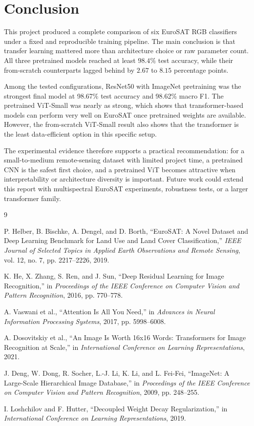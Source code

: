 \documentclass[11pt]{report}
\newcommand{\BestModel}{ResNet50 with ImageNet pretraining}
\newcommand{\BestAcc}{98.67}
\newcommand{\BestMacroFOne}{98.62}
\begin{document}
\chapter{Conclusion}
This project produced a complete comparison of six EuroSAT RGB classifiers under a fixed and reproducible training pipeline. The main conclusion is that transfer learning mattered more than architecture choice or raw parameter count. All three pretrained models reached at least \(98.4\%\) test accuracy, while their from-scratch counterparts lagged behind by \(2.67\) to \(8.15\) percentage points.

Among the tested configurations, \BestModel{} was the strongest final model at \BestAcc{}\% test accuracy and \BestMacroFOne{}\% macro F1. The pretrained ViT-Small was nearly as strong, which shows that transformer-based models can perform very well on EuroSAT once pretrained weights are available. However, the from-scratch ViT-Small result also shows that the transformer is the least data-efficient option in this specific setup.

The experimental evidence therefore supports a practical recommendation: for a small-to-medium remote-sensing dataset with limited project time, a pretrained CNN is the safest first choice, and a pretrained ViT becomes attractive when interpretability or architecture diversity is important. Future work could extend this report with multispectral EuroSAT experiments, robustness tests, or a larger transformer family.

\begin{thebibliography}{9}

P. Helber, B. Bischke, A. Dengel, and D. Borth,
``EuroSAT: A Novel Dataset and Deep Learning Benchmark for Land Use and Land Cover Classification,''
\emph{IEEE Journal of Selected Topics in Applied Earth Observations and Remote Sensing}, vol. 12, no. 7, pp. 2217--2226, 2019.

K. He, X. Zhang, S. Ren, and J. Sun,
``Deep Residual Learning for Image Recognition,''
in \emph{Proceedings of the IEEE Conference on Computer Vision and Pattern Recognition}, 2016, pp. 770--778.

A. Vaswani et al.,
``Attention Is All You Need,''
in \emph{Advances in Neural Information Processing Systems}, 2017, pp. 5998--6008.

A. Dosovitskiy et al.,
``An Image Is Worth 16x16 Words: Transformers for Image Recognition at Scale,''
in \emph{International Conference on Learning Representations}, 2021.

J. Deng, W. Dong, R. Socher, L.-J. Li, K. Li, and L. Fei-Fei,
``ImageNet: A Large-Scale Hierarchical Image Database,''
in \emph{Proceedings of the IEEE Conference on Computer Vision and Pattern Recognition}, 2009, pp. 248--255.

I. Loshchilov and F. Hutter,
``Decoupled Weight Decay Regularization,''
in \emph{International Conference on Learning Representations}, 2019.

\end{thebibliography}
\end{document}
